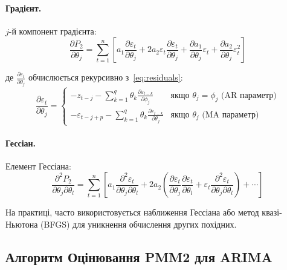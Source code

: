 \documentclass[12pt,a4paper]{article}
\begin{document}
\paragraph{Градієнт.}

$j$-й компонент градієнта:
\begin{equation}
\label{eq:gradient_j}
\frac{\partial P_2}{\partial \theta_j} = \sum_{t=1}^{n} \left[ a_1 \frac{\partial \varepsilon_t}{\partial \theta_j} + 2 a_2 \varepsilon_t \frac{\partial \varepsilon_t}{\partial \theta_j} + \frac{\partial a_1}{\partial \theta_j} \varepsilon_t + \frac{\partial a_2}{\partial \theta_j} \varepsilon_t^2 \right]
\end{equation}

де $\frac{\partial \varepsilon_t}{\partial \theta_j}$ обчислюється рекурсивно з~\eqref{eq:residuals}:
\begin{equation}
\label{eq:residual_derivative}
\frac{\partial \varepsilon_t}{\partial \theta_j} = \begin{cases}
-z_{t-j} - \sum_{k=1}^{q} \theta_k \frac{\partial \varepsilon_{t-k}}{\partial \phi_j} & \text{якщо } \theta_j = \phi_j \text{ (AR параметр)} \\
-\varepsilon_{t-j+p} - \sum_{k=1}^{q} \theta_k \frac{\partial \varepsilon_{t-k}}{\partial \theta_j} & \text{якщо } \theta_j \text{ (MA параметр)}
\end{cases}
\end{equation}

\paragraph{Гессіан.}

Елемент Гессіана:
\begin{equation}
\label{eq:hessian_jl}
\frac{\partial^2 P_2}{\partial \theta_j \partial \theta_l} = \sum_{t=1}^{n} \left[ a_1 \frac{\partial^2 \varepsilon_t}{\partial \theta_j \partial \theta_l} + 2 a_2 \left( \frac{\partial \varepsilon_t}{\partial \theta_j} \frac{\partial \varepsilon_t}{\partial \theta_l} + \varepsilon_t \frac{\partial^2 \varepsilon_t}{\partial \theta_j \partial \theta_l} \right) + \cdots \right]
\end{equation}

На практиці, часто використовується наближення Гессіана або метод квазі-Ньютона (BFGS) для уникнення обчислення других похідних.

\subsection{Алгоритм Оцінювання PMM2 для ARIMA}
\label{subsec:algorithm}
\end{document}

